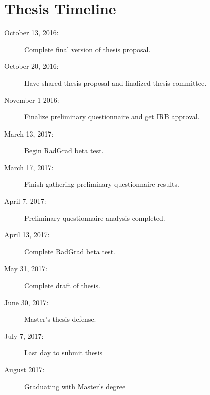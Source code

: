 \chapter{Thesis Timeline}
\begin{description}
\item[October 13, 2016:] Complete final version of thesis proposal. 
\item[October 20, 2016:] Have shared thesis proposal and finalized thesis committee.
\item[November 1 2016:] Finalize preliminary questionnaire and get IRB approval.
\item[March 13, 2017:] Begin RadGrad beta test.
\item[March 17, 2017:] Finish gathering preliminary questionnaire results.
\item[April 7, 2017:] Preliminary questionnaire analysis completed.
\item[April 13, 2017:] Complete RadGrad beta test.
\item[May 31, 2017:] Complete draft of thesis.
\item[June 30, 2017:] Master's thesis defense.
\item[July 7, 2017:] Last day to submit thesis
\item[August 2017:] Graduating with Master's degree
\end{description}